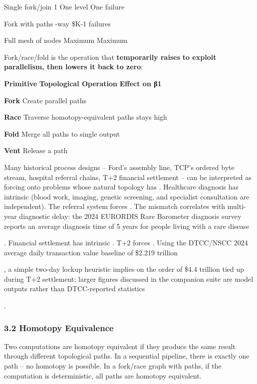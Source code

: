 \documentclass[
]{article}
\begin{document}
Single fork/join \textbar{} 1 \textbar{} One level \textbar{} One
failure \textbar{}

Fork with paths \textbar{} \textbar{} -way \textbar{} \$K-1 failures
\textbar{}

Full mesh of nodes \textbar{} \textbar{} Maximum \textbar{} Maximum
\textbar{}

Fork/race/fold is the operation that \textbf{temporarily raises}
\textbf{to exploit parallelism, then lowers it back to zero}:

\textbf{Primitive} \textbar{} \textbf{Topological Operation} \textbar{}
\textbf{Effect on β1\hspace{0pt}} \textbar{}

\textbf{Fork} \textbar{} Create parallel paths \textbar{} \textbar{}

\textbf{Race} \textbar{} Traverse homotopy-equivalent paths \textbar{}
stays high \textbar{}

\textbf{Fold} \textbar{} Merge all paths to single output \textbar{}
\textbar{}

\textbf{Vent} \textbar{} Release a path \textbar{} \textbar{}

Many historical process designs -- Ford's assembly line, TCP's ordered
byte stream, hospital referral chains, T+2 financial settlement -- can
be interpreted as forcing onto problems whose natural topology has .
Healthcare diagnosis has intrinsic (blood work, imaging, genetic
screening, and specialist consultation are independent). The referral
system forces . The mismatch correlates with multi-year diagnostic
delay: the 2024 EURORDIS Rare Barometer diagnosis survey reports an
average diagnosis time of 5 years for people living with a rare disease

. Financial settlement has intrinsic . T+2 forces . Using the DTCC/NSCC
2024 average daily transaction value baseline of \$2.219 trillion

, a simple two-day lockup heuristic implies on the order of \$4.4
trillion tied up during T+2 settlement; larger figures discussed in the
companion suite are model outputs rather than DTCC-reported statistics

.

\subsubsection{\texorpdfstring{\textbf{3.2 Homotopy
Equivalence}}{3.2 Homotopy Equivalence}}\label{homotopy-equivalence}

Two computations are homotopy equivalent if they produce the same result
through different topological paths. In a sequential pipeline, there is
exactly one path -- no homotopy is possible. In a fork/race graph with
paths, if the computation is deterministic, all paths are homotopy
equivalent.
\end{document}
